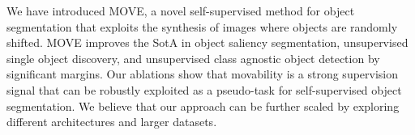 \documentclass{article}
\newcommand\methodname{MOVE\xspace}
\begin{document}
We have introduced \methodname, a novel self-supervised method for object segmentation that exploits the synthesis of images where objects are randomly shifted. 
\methodname improves the SotA in object saliency segmentation, unsupervised single object discovery, and unsupervised class agnostic object detection by significant margins. Our ablations show that movability is a strong supervision signal that can be robustly exploited as a pseudo-task for self-supervised object segmentation. We believe that our approach can be further scaled by exploring different architectures and larger datasets.












\end{document}
